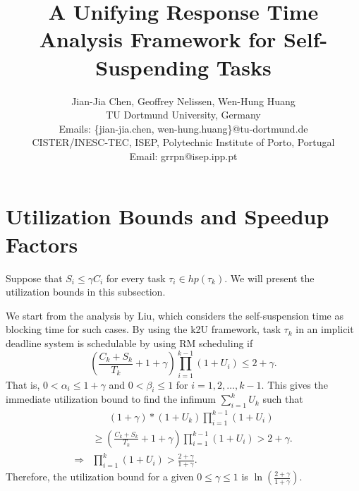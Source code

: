 \documentclass[10pt,conference,preprint]{IEEEtran}
\begin{document}
  
\title{A Unifying Response Time Analysis Framework for Self-Suspending Tasks}

\author{Jian-Jia Chen, Geoffrey Nelissen, Wen-Hung Huang\\
 TU Dortmund University, Germany\\
Emails: \{jian-jia.chen, wen-hung.huang\}@tu-dortmund.de\\
 CISTER/INESC-TEC, ISEP, Polytechnic Institute of Porto, Portugal \\
Email: grrpn@isep.ipp.pt
}

\maketitle

\begin{abstract}
  
\end{abstract}

























\section{Utilization Bounds and Speedup Factors}
Suppose that $S_i \leq \gamma C_i$ for every task $\tau_i \in hp(\tau_k)$. We will present the utilization bounds in this subsection. 

We start from the analysis by Liu, which considers the self-suspension time as blocking time for such cases.
By using the k2U framework, task $\tau_k$ in an implicit deadline system is schedulable by using RM scheduling if
\[
(\frac{C_k + S_k}{ T_k}+1+\gamma) \prod_{i=1}^{k-1}(1+U_i) \leq 2+\gamma.
\]
That is, $0 < \alpha_i \leq  1+\gamma$ and $0 < \beta_i \leq 1$ for $i=1,2,\ldots,k-1$.
This gives the immediate utilization bound to find the infimum $\sum_{i=1}^{k} U_k$ such that
\begin{align*}
&\;\;\;\;\;\; (1+\gamma)*(1+U_k) \prod_{i=1}^{k-1}(1+U_i) \\
&\geq (\frac{C_k + S_k}{ T_k}+1+\gamma) \prod_{i=1}^{k-1}(1+U_i) > 2+\gamma.\\
\Rightarrow & \prod_{i=1}^{k}(1+U_i) > \frac{2+\gamma}{1+\gamma}.
\end{align*}
Therefore, the utilization bound for a given $0 \leq \gamma \leq 1$  is $\ln(\frac{2+\gamma}{1+\gamma})$.
\end{document}
